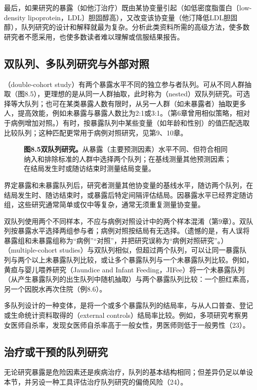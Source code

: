 最后，如果研究的暴露（如他汀治疗）既由某协变量引起（如低密度脂蛋白〔low-density lipoprotein，LDL〕胆固醇高），又改变该协变量（他汀降低LDL胆固醇），队列研究的设计和解释就最为复杂。分析此类资料所需的高级方法，使多数研究者不愿采用，也使多数读者难以理解或信服结果报告。

\subsection{双队列、多队列研究与外部对照}
（double-cohort study）有两个暴露水平不同的独立参与者队列。可从不同人群抽取（图8.5），更理想的是从同一人群抽取，此时称为（nested）双队列研究。可选择等大队列；也可在某类暴露人数有限时，从另一人群（如未暴露者）抽取更多人，提高效能，例如未暴露与暴露人数比为2:1或3:1。（第6章曾用相似策略，相对于病例增加对照。）有时，按暴露队列中某些变量（如年龄和性别）的值匹配选取比较队列；这种匹配更常用于病例对照研究，见第9、10章。
\begin{figure}[htbp]\centering\chEightDouble
\caption*{\textbf{图8.5\quad 双队列研究。}从暴露（主要预测因素）水平不同、但符合相同纳入和排除标准的人群中选择两个队列；在基线测量其他预测因素；在结局发生时或随访结束时测量结局变量。}
\end{figure}

界定暴露和未暴露队列后，研究者测量其他协变量的基线水平，随访两个队列，在结局发生时、随访结束时，或暴露后特定间隔评估结局。因暴露水平已经界定随访组，这些研究通常简单或仅中等复杂，通常无须重复测量协变量。

双队列使用两个不同样本，不应与病例对照设计中的两个样本混淆（第9章）。双队列按暴露水平选择两组参与者；病例对照按结局有无选择。（遗憾的是，有人误将暴露组和未暴露组称为“病例”“对照”，并把研究误称为“病例对照研究”。）
（multiple-cohort studies）与双队列相似，但超过两个队列，可以让同一暴露队列与两个以上未暴露队列比较，或让多个暴露队列与一个未暴露队列比较。例如，黄疸与婴儿喂养研究（Jaundice and Infant Feeding，JIFee）将一个未暴露队列（从产生暴露队列的出生队列中随机抽取）与两个暴露队列比较：一个胆红素高，另一个因脱水再次住院（例8.6）。

多队列设计的一种变体，是将一个或多个暴露队列的结局率，与从人口普查、登记或生命统计资料取得的（external controls）结局率比较。例如，多项研究考察男女医师自杀率，发现女医师自杀率高于一般女性，男医师则低于一般男性（23）。

\subsection{治疗或干预的队列研究}
无论研究暴露是危险因素还是疾病治疗，队列的基本结构相同；但差异仍足以单设本节，并另设一种工具评估治疗队列研究的偏倚风险（24）。

